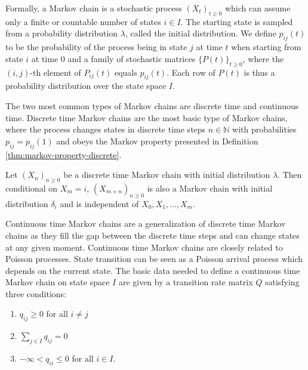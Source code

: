Formally, a Markov chain is a stochastic process $(X_t)_{t \ge 0}$ which can assume 
only a finite or countable number of states $i \in I$. The starting state
is sampled from a probability distribution $\lambda$, called the initial distribution.
We define $p_{ij}(t)$ to be the probability of the process being in state $j$ at time $t$
when starting from state $i$ at time $0$ and a family of stochastic matrices $\{P(t)\}_{t \ge 0}$,
where the $(i,j)$-th element of $P_{ij}(t)$ equals $p_{ij}(t)$.
Each row of $P(t)$ is thus a probability distribution over the state space $I$. %


The two most common types of Markov chains are discrete time and continuous time.
Discrete time Markov chains are the most basic type of Markov chains, where the process
changes states in discrete time steps $n \in \mathbb{N}$ with probabilities $p_{ij} = p_{ij}(1)$
and obeys the Markov property presented in Definition \ref{thm:markov-property-discrete}.

\begin{defn}
\label{thm:markov-property-discrete}
Let $(X_n)_{n \ge 0}$ be a discrete time Markov chain with initial distribution $\lambda$.
Then conditional on $X_m = i$, $(X_{m + n})_{n \ge 0}$ is also a Markov chain with initial
distribution $\delta_i$ and is independent of $X_0, X_1, ..., X_m$.
\end{defn}

Continuous time Markov chains are a generalization of discrete time Markov chains as they
fill the gap between the discrete time steps and can change states at any given moment.
Continuous time Markov chains are closely related to Poisson processes. State transition can be seen as a Poisson arrival process which depends on the current state. 
%
%
The basic data needed to define a continuous time Markov chain on state space $I$ are
given by a transition rate matrix $Q$ satisfying three conditions:
\begin{enumerate}
	\item $q_{ij} \ge 0$ for all $i \ne j$
	\item $\sum_{j \in I} q_{ij} = 0$
	\item $-\infty < q_{ii} \le 0$ for all $i \in I$.
\end{enumerate}

